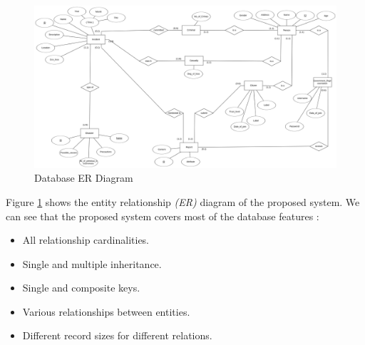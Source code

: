 \begin{figure}[H]
    \centering
    \includegraphics[width=\textwidth]{images/er_diagram.png}
    \caption{Database ER Diagram}
    \label{fig:er}
\end{figure}

Figure \ref{fig:er} shows the entity relationship \emph{(ER)} diagram of the proposed system. We can see that the proposed system covers most of the database features :
\begin{itemize}
    \item All relationship cardinalities.
    \item Single and multiple inheritance.
    \item Single and composite keys.
    \item Various relationships between entities.
    \item Different record sizes for different relations.
\end{itemize}